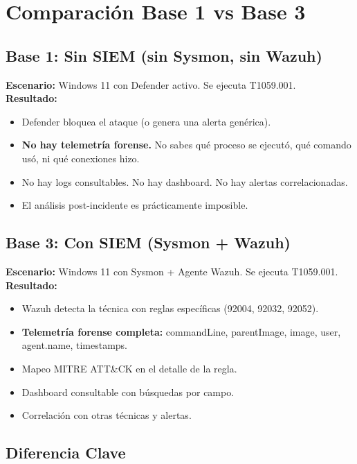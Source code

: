 \documentclass[11pt,a4paper]{article}
\begin{document}
	\section{Comparación Base 1 vs Base 3}
	
	\subsection{Base 1: Sin SIEM (sin Sysmon, sin Wazuh)}
	
	\textbf{Escenario:} Windows 11 con Defender activo. Se ejecuta T1059.001. \\
	
	\textbf{Resultado:}
	\begin{itemize}[leftmargin=1.5em]
		\item Defender bloquea el ataque (o genera una alerta genérica).
		\item \textbf{No hay telemetría forense.} No sabes qué proceso se ejecutó, qué comando usó, ni qué conexiones hizo.
		\item No hay logs consultables. No hay dashboard. No hay alertas correlacionadas.
		\item El análisis post-incidente es prácticamente imposible.
	\end{itemize}
	
	\subsection{Base 3: Con SIEM (Sysmon + Wazuh)}
	
	\textbf{Escenario:} Windows 11 con Sysmon + Agente Wazuh. Se ejecuta T1059.001. \\
	
	\textbf{Resultado:}
	\begin{itemize}[leftmargin=1.5em]
		\item Wazuh detecta la técnica con reglas específicas (92004, 92032, 92052).
		\item \textbf{Telemetría forense completa:} commandLine, parentImage, image, user, agent.name, timestamps.
		\item Mapeo MITRE ATT\&CK en el detalle de la regla.
		\item Dashboard consultable con búsquedas por campo.
		\item Correlación con otras técnicas y alertas.
	\end{itemize}
	
	\subsection{Diferencia Clave}
	
\end{document}
